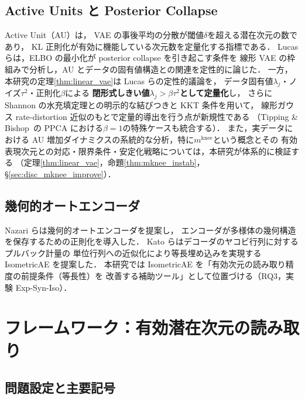 \documentclass[11pt,a4paper]{jsarticle}
\newcommand{\mknee}{m^{\mathrm{knee}}}
\begin{document}
\subsection{Active Units と Posterior Collapse}\label{sec:related_au}

Active Unit（AU）\cite{lucas2019elbo,higgins2017betavae}は，
VAE の事後平均の分散が閾値$\delta$を超える潜在次元の数であり，
KL 正則化が有効に機能している次元数を定量化する指標である．
Lucas ら\cite{lucas2019elbo}は，ELBO の最小化が posterior collapse を引き起こす条件を
線形 VAE の枠組みで分析し，AU とデータの固有値構造との関連を定性的に論じた．
一方，本研究の定理\ref{thm:linear_vae}は Lucas らの定性的議論を，
データ固有値$\lambda_j$・ノイズ$\tau^2$・正則化$\beta$による
\textbf{閉形式しきい値$\lambda_j > \beta\tau^2$として定量化}し，
さらに Shannon の水充填定理との明示的な結びつきと KKT 条件を用いて，
線形ガウス rate-distortion 近似のもとで定量的導出を行う点が新規性である
（Tipping \& Bishop~\cite{tippingbishop1999ppca}の PPCA における$\beta=1$の特殊ケースも統合する）．
また，実データにおける AU 増加ダイナミクスの系統的な分析，特に$\mknee$という概念とその
有効表現次元との対応・限界条件・安定化戦略については，本研究が体系的に検証する
（定理\ref{thm:linear_vae}，命題\ref{thm:mknee_instab}，§\ref{sec:disc_mknee_improve}）．

\subsection{幾何的オートエンコーダ}\label{sec:related_geo}

Nazari ら\cite{nazari2023geometric}は幾何的オートエンコーダを提案し，
エンコーダが多様体の幾何構造を保存するための正則化を導入した．
Kato ら\cite{kato2020rdae}はデコーダのヤコビ行列に対するプルバック計量の
単位行列への近似化により等長埋め込みを実現する IsometricAE を提案した．
本研究では IsometricAE を「有効次元の読み取り精度の前提条件（等長性）を
改善する補助ツール」として位置づける（RQ3，実験 Exp-Syn-Iso）．

\section{フレームワーク：有効潜在次元の読み取り}\label{sec:framework}

\subsection{問題設定と主要記号}\label{sec:framework_setup}
\end{document}
